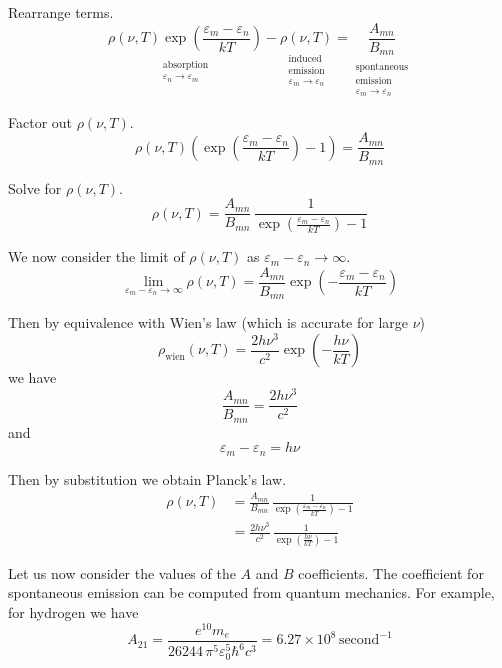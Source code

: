 \documentclass[12pt]{article}
\newcommand\BMN{B_{mn}} %
\newcommand\AMN{A_{mn}} %
\newcommand\RHO{\rho(\nu,T)}
\newcommand\ABSORPTION{\substack{\\[1ex] \text{absorption}\\ \varepsilon_n\rightarrow\varepsilon_m}}
\newcommand\INDUCED{\substack{\\[1ex] \text{induced}\\ \text{emission}\\ \varepsilon_m\rightarrow\varepsilon_n}}
\newcommand\SPONTANEOUS{\substack{\\[1ex] \text{spontaneous}\\ \text{emission}\\ \varepsilon_m\rightarrow\varepsilon_n}}
\begin{document}
\noindent
Rearrange terms.
\begin{equation*}
\underset{\ABSORPTION}{\RHO\exp\left(\frac{\varepsilon_m-\varepsilon_n}{kT}\right)}
-\underset{\INDUCED}{\RHO}=\underset{\SPONTANEOUS}{\frac{\AMN}{\BMN}}
\end{equation*}

\noindent
Factor out $\RHO$.
\begin{equation*}
\RHO\left(\exp\left(\frac{\varepsilon_m-\varepsilon_n}{kT}\right)-1\right)
=\frac{\AMN}{\BMN}
\end{equation*}

\noindent
Solve for $\RHO$.
\begin{equation*}
\RHO
=\frac{\AMN}{\BMN}\,\frac{1}{\exp\left(\frac{\varepsilon_m-\varepsilon_n}{kT}\right)-1}
\end{equation*}

\noindent
We now consider the limit of $\RHO$ as $\varepsilon_m-\varepsilon_n\rightarrow\infty$.
\begin{equation*}
\lim_{\varepsilon_m-\varepsilon_n\rightarrow\infty}\RHO
=\frac{\AMN}{\BMN}\exp\left(-\frac{\varepsilon_m-\varepsilon_n}{kT}\right)
\end{equation*}

\noindent
Then by equivalence with Wien's law (which is accurate for large $\nu$)
\begin{equation*}
\rho_\text{wien}(\nu,T)=\frac{2h\nu^3}{c^2}\exp\left(-\frac{h\nu}{kT}\right)
\end{equation*}
we have
\begin{equation*}
\frac{\AMN}{\BMN}=\frac{2h\nu^3}{c^2}
\tag{4}
\end{equation*}
and
\begin{equation*}
\varepsilon_m-\varepsilon_n=h\nu
\end{equation*}

\noindent
Then by substitution we obtain Planck's law.
\begin{align*}
\RHO
&=\frac{\AMN}{\BMN}\,\frac{1}{\exp\left(\frac{\varepsilon_m-\varepsilon_n}{kT}\right)-1}
\\[1.5ex]
&=\frac{2h\nu^3}{c^2}\,\frac{1}{\exp\left(\frac{h\nu}{kT}\right)-1}
\end{align*}

\noindent
Let us now consider the values of the $A$ and $B$ coefficients.
The coefficient for spontaneous emission can be computed from quantum mechanics.
For example, for hydrogen we have
\begin{equation*}
A_{21}=\frac{e^{10}m_e}{26244\,\pi^5\varepsilon_0^5\hbar^6 c^3}
=6.27\times10^8\,\text{second}^{-1}
\end{equation*}
\end{document}

